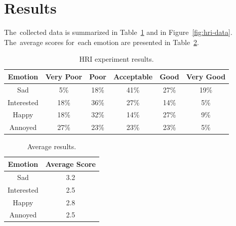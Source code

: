 \section{Results} %

\par The~collected data is summarized in Table~\ref{tab:hri-data} and in Figure~\ref{fig:hri-data}. The~average scores for~each emotion are presented in Table~\ref{tab:average-hri-data}.

\begin{table}[!ht]
    \caption{HRI experiment results.}\label{tab:hri-data}
    \begin{center}
        \begin{tabular}{cccccc}
            \hline
            Emotion & Very Poor & Poor & Acceptable & Good & Very Good \\
            \hline
            Sad & 5\% & 18\% & 41\% & 27\% & 19\% \\
            Interested & 18\% & 36\% & 27\% & 14\% & 5\% \\
            Happy & 18\% & 32\% & 14\% & 27\% & 9\% \\
            Annoyed & 27\% & 23\% & 23\% & 23\% & 5\% \\
            \hline
        \end{tabular}
    \end{center}
\end{table}

\begin{table}[!ht]
    \caption{Average results.}\label{tab:average-hri-data}
    \begin{center}
        \begin{tabular}{cc}
            \hline
            Emotion & Average Score \\
            \hline
            Sad & 3.2 \\
            Interested & 2.5 \\
            Happy & 2.8 \\
            Annoyed & 2.5 \\
            \hline
        \end{tabular}
    \end{center}
\end{table}

